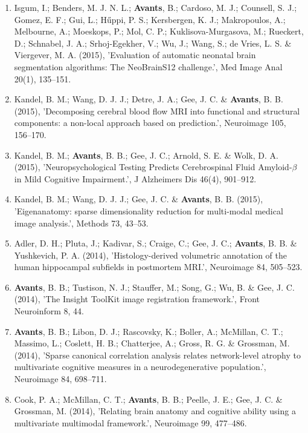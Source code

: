 \documentclass[11pt]{moderncv} %
\begin{document}
\begin{enumerate}
\item Isgum, I.; Benders, M. J. N. L.; \textbf{Avants}, B.; Cardoso, M. J.; Counsell, S. J.; Gomez, E. F.; Gui, L.; Hűppi, P. S.; Kersbergen, K. J.; Makropoulos, A.; Melbourne, A.; Moeskops, P.; Mol, C. P.; Kuklisova-Murgasova, M.; Rueckert, D.; Schnabel, J. A.; Srhoj-Egekher, V.; Wu, J.; Wang, S.; de Vries, L. S. \& Viergever, M. A. (2015), 'Evaluation of automatic neonatal brain segmentation algorithms: The NeoBrainS12 challenge.', Med Image Anal 20(1), 135--151.

\item Kandel, B. M.; Wang, D. J. J.; Detre, J. A.; Gee, J. C. \& \textbf{Avants}, B. B. (2015), 'Decomposing cerebral blood flow MRI into functional and structural components: a non-local approach based on prediction.', Neuroimage 105, 156--170.

\item Kandel, B. M.; \textbf{Avants}, B. B.; Gee, J. C.; Arnold, S. E. \& Wolk, D. A. (2015), 'Neuropsychological Testing Predicts Cerebrospinal Fluid Amyloid-$\beta$ in Mild Cognitive Impairment.', J Alzheimers Dis 46(4), 901--912.

\item Kandel, B. M.; Wang, D. J. J.; Gee, J. C. \& \textbf{Avants}, B. B. (2015), 'Eigenanatomy: sparse dimensionality reduction for multi-modal medical image analysis.', Methods 73, 43--53.

\item Adler, D. H.; Pluta, J.; Kadivar, S.; Craige, C.; Gee, J. C.; \textbf{Avants}, B. B. \&  Yushkevich, P. A. (2014), 'Histology-derived volumetric annotation of the human hippocampal subfields in postmortem MRI.', Neuroimage 84, 505--523.

\item \textbf{Avants}, B. B.; Tustison, N. J.; Stauffer, M.; Song, G.; Wu, B. \&  Gee, J. C. (2014), 'The Insight ToolKit image registration framework.', Front Neuroinform 8, 44.

\item  \textbf{Avants}, B. B.; Libon, D. J.; Rascovsky, K.; Boller, A.; McMillan, C. T.; Massimo, L.; Coslett, H. B.; Chatterjee, A.; Gross, R. G. \&  Grossman, M. (2014), 'Sparse canonical correlation analysis relates network-level atrophy to multivariate cognitive measures in a neurodegenerative population.', Neuroimage 84, 698--711.

\item  Cook, P. A.; McMillan, C. T.; \textbf{Avants}, B. B.; Peelle, J. E.; Gee, J. C. \&  Grossman, M. (2014), 'Relating brain anatomy and cognitive ability using a multivariate multimodal framework.', Neuroimage 99, 477--486.


\end{enumerate}
\end{document}
